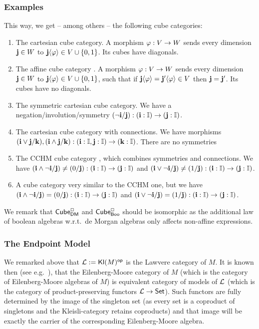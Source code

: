 \documentclass[a4paper]{memoir}
\begin{document}
\subsubsection{Examples}
This way, we get -- among others -- the following cube categories:
\begin{enumerate}
	\item[$\cubecat^\cartes_{\bipointed}$] The cartesian cube category.
	A morphism $\varphi : V \to W$ sends every dimension $\mathbf{j} \in W$ to $\mathbf{j} \langle \varphi \rangle \in V \cup \mathopen{}\left\{ 0, 1 \right\}\mathclose{}$.
	Its cubes have diagonals.
	\item[$\cubecat^\affine_{\bipointed}$] The affine cube category \cite{bch}.
	A morphism $\varphi : V \to W$ sends every dimension $\mathbf{j} \in W$ to $\mathbf{j} \langle \varphi \rangle \in V \cup \mathopen{}\left\{ 0, 1 \right\}\mathclose{}$, such that if $\mathbf{j}\langle \varphi \rangle = \mathbf{j}' \langle \varphi \rangle \in V$ then $\mathbf{j} = \mathbf{j}'$.
	Its cubes have no diagonals.
	\item[$\cubecat^\cartes_{\bipointedsym}$] The symmetric cartesian cube category. We have a negation/involution/symmetry $(\lnot \mathbf{i} / \mathbf{j}) : (\mathbf{i} : {\mathbb I}) \to (\mathbf{j} : {\mathbb I})$.
	\item[$\cubecat^\cartes_{\distlattice}$] The cartesian cube category with connections. We have morphisms $(\mathbf{i} \vee \mathbf{j} / \mathbf{k}), (\mathbf{i} \wedge \mathbf{j} / \mathbf{k}) : (\mathbf{i} : {\mathbb I}, \mathbf{j} : {\mathbb I}) \to (\mathbf{k} : {\mathbb I})$. There are no symmetries
	\item[$\cubecat^\cartes_{\demorgan}$] The CCHM cube category \cite{cubical}, which combines symmetries and connections. We have $(\mathbf{i} \wedge \lnot \mathbf{i} / \mathbf{j}) \neq (0/\mathbf{j}) : (\mathbf{i} : {\mathbb I}) \to (\mathbf{j} : {\mathbb I})$ and $(\mathbf{i} \vee \lnot \mathbf{i} / \mathbf{j}) \neq (1/\mathbf{j}) : (\mathbf{i} : {\mathbb I}) \to (\mathbf{j} : {\mathbb I})$.
	\item[$\cubecat^\cartes_{\booleanalg}$] A cube category very similar to the CCHM one, but we have $(\mathbf{i} \wedge \lnot \mathbf{i} / \mathbf{j}) = (0/\mathbf{j}) : (\mathbf{i} : {\mathbb I}) \to (\mathbf{j} : {\mathbb I})$ and $(\mathbf{i} \vee \lnot \mathbf{i} / \mathbf{j}) = (1/\mathbf{j}) : (\mathbf{i} : {\mathbb I}) \to (\mathbf{j} : {\mathbb I})$.
\end{enumerate}
We remark that ${\mathsf{Cube}}^\Box_{\mathsf{DM}}$ and ${\mathsf{Cube}}^\Box_{\mathsf{Boo}}$ should be isomorphic as the additional law of boolean algebras w.r.t.\ de Morgan algebras only affects non-affine expressions.

\subsubsection{The Endpoint Model}
We remarked above that ${\mathcal L} := {\mathsf{Kl}}(M)^{\mathsf{op}}$ is the Lawvere category of $M$.
It is known then (see e.g.\ \cite{keml-diagrams}), that the Eilenberg-Moore category of $M$ (which is the category of Eilenberg-Moore algebras of $M$) is equivalent category of models of ${\mathcal L}$ (which is the category of product-preserving functors ${\mathcal L} \to {\mathsf{Set}}$).
Such functors are fully determined by the image of the singleton set (as every set is a coproduct of singletons and the Kleisli-category retains coproducts) and that image will be exactly the carrier of the corresponding Eilenberg-Moore algebra.
\end{document}
